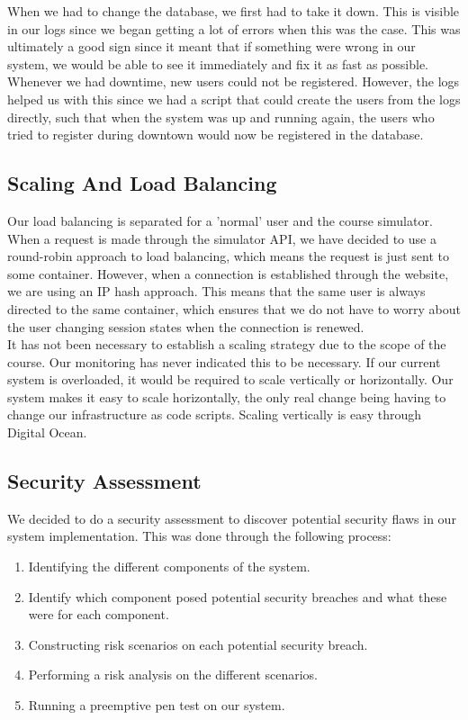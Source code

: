 When we had to change the database, we first had to take it down. This is visible in our logs since we began getting a lot of errors when this was the case. This was ultimately a good sign since it meant that if something were wrong in our system, we would be able to see it immediately and fix it as fast as possible. \\

Whenever we had downtime, new users could not be registered. However, the logs helped us with this since we had a script that could create the users from the logs directly, such that when the system was up and running again, the users who tried to register during downtown would now be registered in the database.

\subsection{Scaling And Load Balancing}
Our load balancing is separated for a 'normal' user and the course simulator. When a request is made through the simulator API, we have decided to use a round-robin approach to load balancing, which means the request is just sent to some container. However, when a connection is established through the website, we are using an IP hash approach. This means that the same user is always directed to the same container, which ensures that we do not have to worry about the user changing session states when the connection is renewed. \\

It has not been necessary to establish a scaling strategy due to the scope of the course. Our monitoring has never indicated this to be necessary. If our current system is overloaded, it would be required to scale vertically or horizontally. Our system makes it easy to scale horizontally, the only real change being having to change our infrastructure as code scripts. Scaling vertically is easy through Digital Ocean.

\subsection{Security Assessment}
We decided to do a security assessment to discover potential security flaws in our system implementation. This was done through the following process: 
\begin{enumerate}
    \item Identifying the different components of the system.
    \item Identify which component posed potential security breaches and what these were for each component.
    \item Constructing risk scenarios on each potential security breach.
    \item Performing a risk analysis on the different scenarios.
    \item Running a preemptive pen test on our system.
\end{enumerate}

